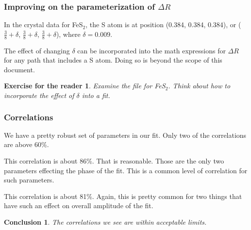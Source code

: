 \documentclass[10pt, xcolor=x11names, compress, handout]{beamer}
\newcommand{\fes}{FeS$_2$}
\newtheorem{conclusion}[theorem]{Conclusion}
\newtheorem{exercise}[theorem]{Exercise for the reader}
\begin{document}
\begin{frame}
  \frametitle{Improving on the parameterization of $\Delta R$}
  In the crystal data for {\fes}, the S atom is at position (0.384,
  0.384, 0.384), or ($\frac{3}{8}+\delta$, $\frac{3}{8}+\delta$,
  $\frac{3}{8}+\delta$), where $\delta=0.009$.

  \medskip

  The effect of changing $\delta$ can be incorporated into the math
  expressions for $\Delta R$ for any path that includes a S atom.
  Doing so is beyond the scope of this document.

  \begin{exercise}
    Examine the  file for {\fes}.  Think about how to
    incorporate the effect of $\delta$ into a fit.
  \end{exercise}
\end{frame}

\begin{frame}
  \frametitle{Correlations}
  We have a pretty robust set of parameters in our fit.  Only two of
  the correlations are above 60\%.  

  \begin{description}
  \item[$\Delta E_0$ and $\alpha$] This correlation is about 86\%.
    That is reasonable.  Those are the only two parameters effecting
    the phase of the fit.  This is a common level of correlation for
    such parameters.
  \item[1$^{\mathrm{st}}$ shell $\sigma^2$ and amplitude] This
    correlation is about 81\%.  Again, this is pretty common for two
    things that have such an effect on overall amplitude of the fit.
  \end{description}

  \begin{conclusion}
    The correlations we see are within acceptable limits.
  \end{conclusion}

\end{frame}
\end{document}
